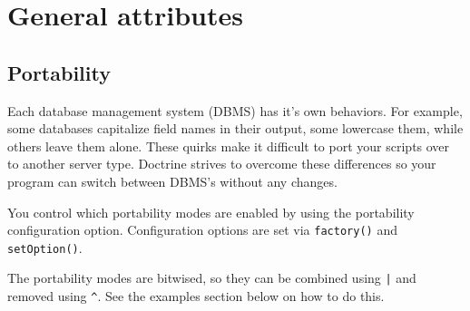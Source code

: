 \documentclass[11pt,a4paper]{report}
\begin{document}
\section{General attributes}
\subsection{Portability}
Each database management system (DBMS) has it's own behaviors. For example, some databases capitalize field names in their output, some lowercase them, while others leave them alone. These quirks make it difficult to port your scripts over to another server type. Doctrine strives to overcome these differences so your program can switch between DBMS's without any changes.

You control which portability modes are enabled by using the portability configuration option. Configuration options are set via \texttt{factory()} and \texttt{setOption()}.

The portability modes are bitwised, so they can be combined using \texttt{|} and removed using \texttt{\^}. See the examples section below on how to do this.
\end{document}
